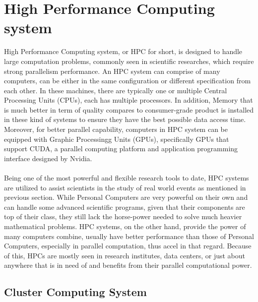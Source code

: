 \section{High Performance Computing system}
High Performance Computing system, or HPC for short, is designed to handle large computation problems, commonly seen in scientific researches, which require strong parallelism performance. An HPC system can comprise of many computers, can be either in the same configuration or different specification from each other. In these machines, there are typically one or multiple Central Processing Units (CPUs), each has multiple processors. In addition, Memory that is much better in term of quality compares to consumer-grade product is installed in these kind of systems to ensure they have the best possible data access time. Moreover, for better parallel capability, computers in HPC system can be equipped with Graphic Processingg Units (GPUs), specifically GPUs that support CUDA, a parallel computing platform and application programming interface designed by Nvidia. \\
~\\
Being one of the most powerful and flexible research tools to date, HPC systems are utilized to assist scientists in the study of real world events as mentioned in previous section. While Personal Computers are very powerful on their own and can handle some advanced scientific programs, given that their components are top of their class, they still lack the horse-power needed to solve much heavier mathematical problems. HPC systems, on the other hand, provide the power of many computers combine, usually have better performance than those of Personal Computers, especially in parallel computation, thus accel in that regard. Because of this, HPCs are mostly seen in research institutes, data centers, or just about anywhere that is in need of and benefits from their parallel computational power. \\

\subsection{Cluster Computing System}

